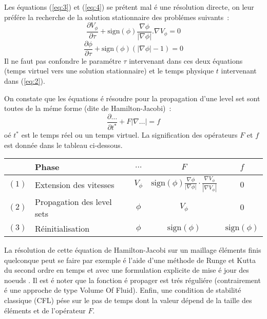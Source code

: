 

Les \'equations (\ref{eq:3}) et (\ref{eq:4}) se pr\'etent mal
\'e une r\'esolution directe, on leur pr\'ef\'ere la recherche
de la solution stationnaire des probl\'emes suivants~:
\begin{equation}
    \frac{\partial
    V_{\phi}}{\partial\tau}+\textrm{sign}(\phi)\frac{\nabla\phi}{\left|\nabla\phi\right|}.\nabla V_{\phi}=0
    \label{eq:hamilton38}
\end{equation}
\begin{equation}
    \frac{\partial\phi}{\partial\tau}+\textrm{sign}\left(\phi\right)\left(\left|\nabla\phi\right|-1\right)=0
    \label{eq:hamilton39}
\end{equation}
Il ne faut pas confondre le param\'etre $\tau$ intervenant dans ces
deux \'equations (temps virtuel vers
une solution stationnaire) et le temps physique $t$ intervenant dans
(\ref{eq:2}).

On constate que les \'equations \'e r\'esoudre pour
la propagation d'une level set sont toutes
de la m\'eme forme (dite de Hamilton-Jacobi)~:
\begin{equation}
\frac{\partial\ldots}{\partial t^*}+F \left|\nabla\ldots\right|=f
\end{equation}
o\'e $t^*$ est le temps r\'eel ou un temps virtuel.
La signification des op\'erateurs $F$ et $f$ est donn\'ee dans le
tableau ci-dessous.
\begin{table}[htbp]
\begin{center}\begin{tabular}{|c|p{6cm}|c|c|c|}
\hline
&
Phase&
$\ldots$&
$F$&
$f$\tabularnewline
\hline
$(1)$&
Extension des vitesses&
$V_{\phi}$&
$\textrm{sign}(\phi)\frac{\nabla\phi}{\left|\nabla\phi\right|}\cdot\frac{\nabla V_{\phi}}{\left|\nabla V_{\phi}\right|}$&
$0$\tabularnewline
\hline
$(2)$&
Propagation des level sets &
$\phi$&
$V_{\phi}$&
$0$\tabularnewline
\hline
$(3)$&
R\'einitialisation&
$\phi$&
$\textrm{sign}(\phi)$&
$\textrm{sign}(\phi)$ \tabularnewline
\hline
\end{tabular}\end{center}
\end{table}

La r\'esolution de cette \'equation de Hamilton-Jacobi 
sur un maillage \'el\'ements finis quelconque peut se faire
par exemple \'e l'aide d'une m\'ethode de Runge et Kutta du second ordre en temps
et avec une formulation explicite de mise \'e jour des
noeuds \cite{barth-sethian,OsherFedkiw02}.
Il est \'e noter que la fonction \'e propager
est tr\'es  r\'eguli\'ere
(contrairement \'e une approche de type Volume Of Fluid).
Enfin, une condition de stabilit\'e classique (CFL)
p\'ese sur le pas de temps
dont la valeur d\'epend de la taille des \'el\'ements et de
l'op\'erateur $F$.

